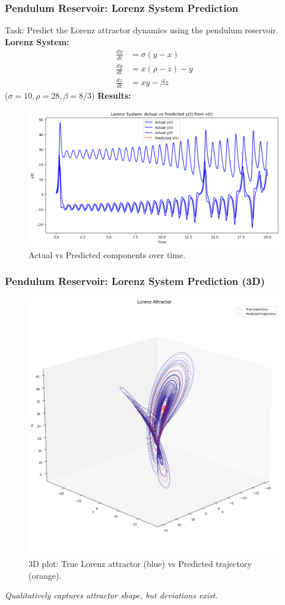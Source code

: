 \documentclass{beamer}
\begin{document}
\begin{frame}
    \frametitle{Pendulum Reservoir: Lorenz System Prediction}
    Task: Predict the Lorenz attractor dynamics using the pendulum reservoir.
    \textbf{Lorenz System:}
    \begin{align*}
        \frac{dx}{dt} &= \sigma (y - x) \\
        \frac{dy}{dt} &= x (\rho - z) - y \\
        \frac{dz}{dt} &= x y - \beta z
    \end{align*}
    ($\sigma=10, \rho=28, \beta=8/3$) \pause
    \textbf{Results:}
    \begin{figure}
        \includegraphics[width=0.9\linewidth]{figures/lorentz_pendulum_1.png}
        \caption{Actual vs Predicted components over time.}
        \label{fig:lorentz_1_slide}
    \end{figure}
\end{frame}

\begin{frame}
    \frametitle{Pendulum Reservoir: Lorenz System Prediction (3D)}
    \begin{figure}
        \centering
        \includegraphics[width=0.8\linewidth]{figures/lorentz_pendulum_2.png}
        \caption{3D plot: True Lorenz attractor (blue) vs Predicted trajectory (orange).}
        \label{fig:lorentz_2_slide}
    \end{figure}
    \textit{Qualitatively captures attractor shape, but deviations exist.}
\end{frame}
\end{document}
